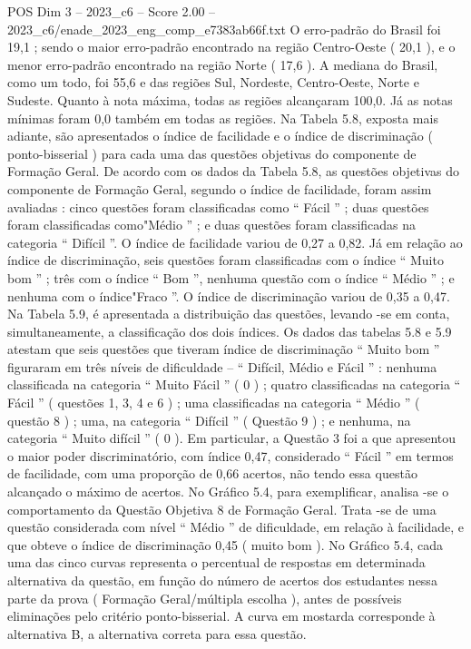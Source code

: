\begin{textsample}{POS Dim 3 – 2023\_c6 – Score 2.00 – 2023\_c6/enade\_2023\_eng\_comp\_e7383ab66f.txt}
O erro-padrão do Brasil foi 19,1 ; sendo o maior erro-padrão encontrado na região Centro-Oeste ( 20,1 ), e o menor erro-padrão encontrado na região Norte ( 17,6 ).
A mediana do Brasil, como um todo, foi 55,6 e das regiões Sul, Nordeste, Centro-Oeste, Norte e Sudeste.
Quanto à nota máxima, todas as regiões alcançaram 100,0.
Já as notas mínimas foram 0,0 também em todas as regiões.
Na Tabela 5.8, exposta mais adiante, são apresentados o índice de facilidade e o índice de discriminação ( ponto-bisserial ) para cada uma das questões objetivas do componente de Formação Geral.
De acordo com os dados da Tabela 5.8, as questões objetivas do componente de Formação Geral, segundo o índice de facilidade, foram assim avaliadas : cinco questões foram classificadas como “ Fácil ” ; duas questões foram classificadas como"Médio ” ; e duas questões foram classificadas na categoria “ Difícil ”.
O índice de facilidade variou de 0,27 a 0,82.
Já em relação ao índice de discriminação, seis questões foram classificadas com o índice “ Muito bom ” ; três com o índice “ Bom ”, nenhuma questão com o índice “ Médio ” ; e nenhuma com o índice"Fraco ”.
O índice de discriminação variou de 0,35 a 0,47.
Na Tabela 5.9, é apresentada a distribuição das questões, levando -se em conta, simultaneamente, a classificação dos dois índices.
Os dados das tabelas 5.8 e 5.9 atestam que seis questões que tiveram índice de discriminação “ Muito bom ” figuraram em três níveis de dificuldade – “ Difícil, Médio e Fácil ” : nenhuma classificada na categoria “ Muito Fácil ” ( 0 ) ; quatro classificadas na categoria “ Fácil ” ( questões 1, 3, 4 e 6 ) ; uma classificadas na categoria “ Médio ” ( questão 8 ) ; uma, na categoria “ Difícil ” ( Questão 9 ) ; e nenhuma, na categoria “ Muito difícil ” ( 0 ).
Em particular, a Questão 3 foi a que apresentou o maior poder discriminatório, com índice 0,47, considerado “ Fácil ” em termos de facilidade, com uma proporção de 0,66 acertos, não tendo essa questão alcançado o máximo de acertos.
No Gráfico 5.4, para exemplificar, analisa -se o comportamento da Questão Objetiva 8 de Formação Geral.
Trata -se de uma questão considerada com nível “ Médio ” de dificuldade, em relação à facilidade, e que obteve o índice de discriminação 0,45 ( muito bom ).
No Gráfico 5.4, cada uma das cinco curvas representa o percentual de respostas em determinada alternativa da questão, em função do número de acertos dos estudantes nessa parte da prova ( Formação Geral/múltipla escolha ), antes de possíveis eliminações pelo critério ponto-bisserial.
A curva em mostarda corresponde à alternativa B, a alternativa correta para essa questão.

\end{textsample}
